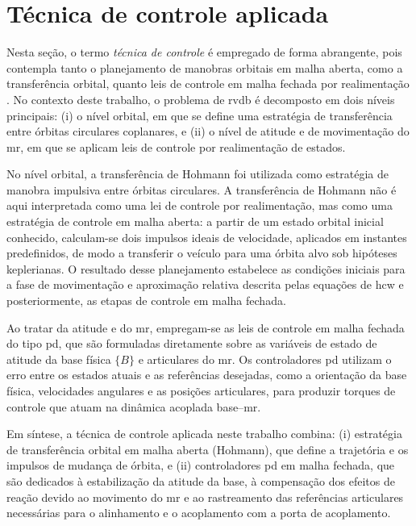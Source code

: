 \section{Técnica de controle aplicada}
\label{sec:tecnica_pd}

Nesta seção, o termo \textit{técnica de controle} é empregado de forma abrangente, pois contempla tanto o planejamento de manobras orbitais em malha aberta, como a transferência orbital, quanto leis de controle em malha fechada por realimentação \cite{astrom1995pid}.
No contexto deste trabalho, o problema de \gls{rvdb} é decomposto em dois níveis principais:
(i) o nível orbital, em que se define uma estratégia de transferência entre órbitas circulares coplanares, e
(ii) o nível de atitude e de movimentação do \gls{mr}, em que se aplicam leis de controle por realimentação de estados.

No nível orbital, a transferência de Hohmann foi utilizada como estratégia de manobra impulsiva entre órbitas circulares.
A transferência de Hohmann não é aqui interpretada como uma lei de controle por realimentação, mas como uma estratégia de controle em malha aberta: a partir de um estado orbital inicial conhecido, calculam-se dois impulsos ideais de velocidade, aplicados em instantes predefinidos, de modo a transferir o veículo para uma órbita alvo sob hipóteses keplerianas.
O resultado desse planejamento estabelece as condições iniciais para a fase de movimentação e aproximação relativa descrita pelas equações de \gls{hcw} e posteriormente, as etapas de controle em malha fechada.

Ao tratar da atitude e do \gls{mr}, empregam-se as leis de controle em malha fechada do tipo \gls{pd}, que são formuladas diretamente sobre as variáveis de estado de atitude da base física $\{B\}$ e articulares do \gls{mr}.
Os controladores \gls{pd} utilizam o erro entre os estados atuais e as referências desejadas, como a orientação da base física, velocidades angulares e as posições articulares, para produzir torques de controle que atuam na dinâmica acoplada base--\gls{mr}.

Em síntese, a técnica de controle aplicada neste trabalho combina:
(i) estratégia de transferência orbital em malha aberta (Hohmann), que define a trajetória e os impulsos de mudança de órbita, e
(ii) controladores \gls{pd} em malha fechada, que são dedicados à estabilização da atitude da base, à compensação dos efeitos de reação devido ao movimento do \gls{mr} e ao rastreamento das referências articulares necessárias para o alinhamento e o acoplamento com a porta de acoplamento.












